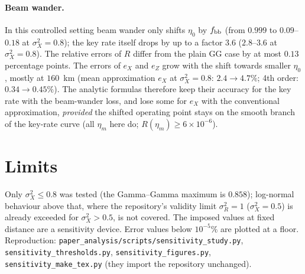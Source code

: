 \documentclass[11pt,a4paper]{article}
\begin{document}
\paragraph{Beam wander.} In this controlled setting beam wander only shifts $\eta_0$ by $f_{\rm bb}$ (from $0.999$ to $0.09$--$0.18$ at $\sigma_X^2=0.8$); the key rate itself drops by up to a factor $3.6$ ($2.8$--$3.6$ at $\sigma_X^2=0.8$). The relative errors of $R$ differ from the plain GG case by at most $0.13$ percentage points. The errors of $e_X$ and $e_Z$ grow with the shift towards smaller $\eta_0$, mostly at $160$~km (mean approximation $e_X$ at $\sigma_X^2=0.8$: $2.4\to4.7\%$; 4th order: $0.34\to0.45\%$). The analytic formulas therefore keep their accuracy for the key rate with the beam-wander loss, and lose some for $e_X$ with the conventional approximation, \emph{provided} the shifted operating point stays on the smooth branch of the key-rate curve (all $\eta_m$ here do; $R(\eta_m)\ge6\times10^{-6}$).

\section{Limits}
Only $\sigma_X^2\le0.8$ was tested (the Gamma--Gamma maximum is $0.858$); log-normal behaviour above that, where the repository's validity limit $\sigma_R^2=1$ ($\sigma_X^2=0.5$) is already exceeded for $\sigma_X^2>0.5$, is not covered. The imposed values at fixed distance are a sensitivity device. Error values below $10^{-5}\%$ are plotted at a floor. Reproduction: \texttt{paper\_analysis/scripts/sensitivity\_study.py}, \texttt{sensitivity\_thresholds.py}, \texttt{sensitivity\_figures.py}, \texttt{sensitivity\_make\_tex.py} (they import the repository unchanged).
\end{document}
